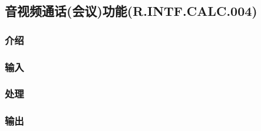 \subsection{音视频通话(会议)功能(R.INTF.CALC.004)}
\subsubsection{介绍}
\subsubsection{输入}
\subsubsection{处理}
\subsubsection{输出}